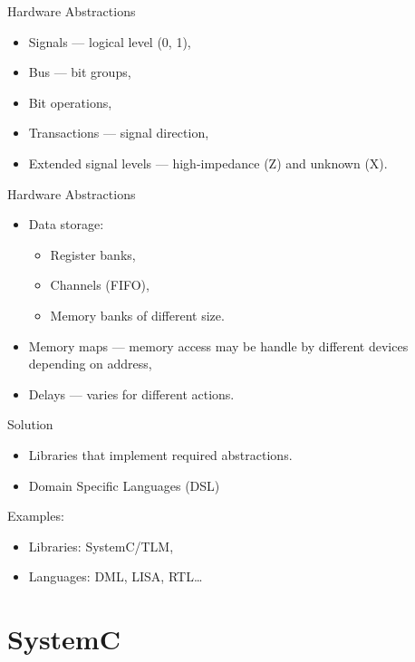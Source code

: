 \begin{frame}{Hardware Abstractions}
  \begin{itemize}
    \item Signals --- logical level (0, 1),
    \item Bus --- bit groups,
    \item Bit operations,
    \item Transactions --- signal direction,
    \item Extended signal levels --- high-impedance (Z) and unknown (X).
  \end{itemize}
\end{frame}

\begin{frame}{Hardware Abstractions}
  \begin{itemize}
    \item Data storage:
    \begin{itemize}
      \item Register banks,
      \item Channels (FIFO),
      \item Memory banks of different size.
    \end{itemize}
    \item Memory maps --- memory access may be handle by different devices
      depending on address,
    \item Delays --- varies for different actions.
  \end{itemize}
\end{frame}

\begin{frame}{Solution}
  \begin{itemize}
    \item Libraries that implement required abstractions.
    \item Domain Specific Languages (DSL)
  \end{itemize}
  \vfill
  \pause
  Examples:
  \begin{itemize}
    \item Libraries: SystemC/TLM,
    \item Languages: DML, LISA, RTL\dots
  \end{itemize}
\end{frame}

\section{SystemC}

